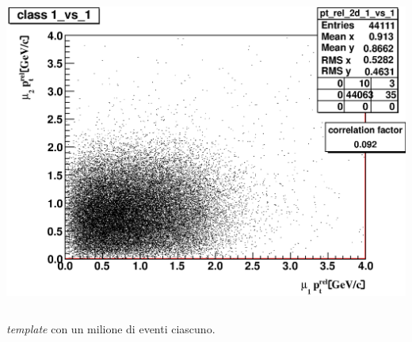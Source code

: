 \documentclass[italian]{beamer}
\begin{document}
\begin{frame}
\begin{columns}
\begin{column}{.3\textwidth}
            \includegraphics[width=.8\textwidth]{pt_rel_2d_1_vs_1.eps}
        \end{column}
    \end{columns}

    \vspace{2\baselineskip}
    \emph{template} con un milione di eventi ciascuno.

\end{frame}
\end{document}
